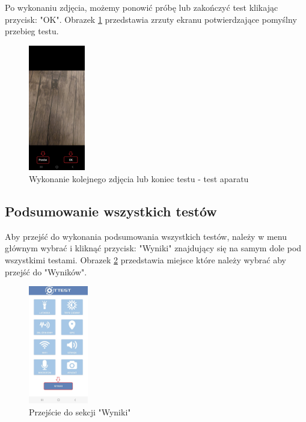 Po wykonaniu zdjęcia, możemy ponowić próbę lub zakończyć test klikając przycisk: "OK".
\newline
Obrazek \ref{rys:aparat2} przedstawia zrzuty ekranu potwierdzające pomyślny przebieg testu.

\begin{figure}[!hbt]
	\begin{center}
		\includegraphics[angle=360, width=0.22\textwidth]{rys/punkt6/aparat2}
		\caption{Wykonanie kolejnego zdjęcia lub koniec testu - test aparatu}
		\label{rys:aparat2}
	\end{center}
\end{figure}
\newpage


\subsection{Podsumowanie wszystkich testów}

Aby przejść do wykonania podsumowania wszystkich testów, należy w menu głównym wybrać i kliknąć przycisk: "Wyniki" znajdujący się na samym dole pod wszystkimi testami.
\newline
Obrazek \ref{rys:menu8} przedstawia miejsce które należy wybrać aby przejść do "Wyników".

\begin{figure}[!hbt]
	\begin{center}
		\includegraphics[angle=360, width=0.23\textwidth]{rys/punkt6/menu8}
		\caption{Przejście do sekcji "Wyniki"}
		\label{rys:menu8}
	\end{center}
\end{figure}

